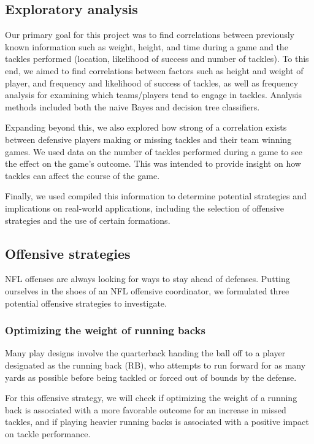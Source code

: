 \documentclass[bibtex, sigconf, hyperref={colorlinks=true,linkcolor=blue,urlcolor=blue}]{acmart}
\begin{document}
\subsection{Exploratory analysis}


Our primary goal for this project was to find correlations between previously
known information such as weight, height, and time during a game and the tackles
performed (location, likelihood of success and number of tackles). To this end,
we aimed to find correlations between factors such as height and
weight of player, and frequency and likelihood of success of tackles, as well as
frequency analysis for examining which teams/players tend to engage in tackles.
Analysis methods included both the naive Bayes and decision tree classifiers.

Expanding beyond this, we also explored how strong of a correlation exists
between defensive players making or missing tackles and their team winning games.
We used data on the number of tackles performed during a game to see the effect on
the game's outcome. This was intended to provide insight on how tackles can affect the
course of the game.

Finally, we used compiled this information to determine potential strategies and implications
on real-world applications, including the selection of offensive strategies and the use of
certain formations.

\subsection{Offensive strategies}

NFL offenses are always looking for ways to stay ahead of defenses. Putting
ourselves in the shoes of an NFL offensive coordinator, we formulated three
potential offensive strategies to investigate.

\subsubsection{Optimizing the weight of running backs}

Many play designs involve the quarterback handing the ball off to a player
designated as the running back (RB), who attempts to run forward for as many
yards as possible before being tackled or forced out of bounds by the defense.

For this offensive strategy, we will check if optimizing the weight of a running
back is associated with a more favorable outcome for an increase in missed
tackles, and if playing heavier running backs is associated with a positive
impact on tackle performance.
\end{document}

